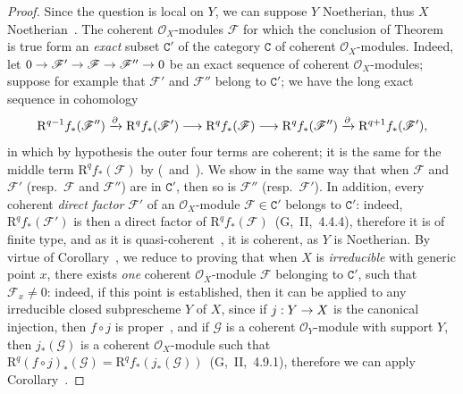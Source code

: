 \documentclass[oneside]{amsart}
\theoremstyle{ega-env-style}
\theoremstyle{ega-thm-env-style}
\theoremstyle{ega-defn-env-style}
\def\mathcal{\mathscr}
\def\sh{\mathcal}                   %
\def\cat{\mathtt}                   %
\def\RR{\mathrm{R}}                 %
\def\C{\cat{C}}                     %
\renewcommand{\to}{\mathchoice{\longrightarrow}{\rightarrow}{\rightarrow}{\rightarrow}}
\newcommand{\oldpage}[2][]{{\marginnote{\normalfont{\textbf{#1}~|~#2}}}\ignorespaces}
\begin{document}
\begin{proof}
Since the question is local on $Y$, we can suppose $Y$ Noetherian, thus $X$ Noetherian~.
The coherent $\sh{O}_X$-modules $\sh{F}$ for which the conclusion of Theorem~ is true form an \emph{exact} subset $\C'$ of the category $\C$ of coherent $\sh{O}_X$-modules.
\oldpage[III]{117}
Indeed, let $0\to\sh{F}'\to\sh{F}\to\sh{F}''\to 0$ be an exact sequence of coherent $\sh{O}_X$-modules; suppose for example that $\sh{F}'$ and $\sh{F}''$ belong to $\C'$; we have the long exact sequence in cohomology
\[
  \RR^{q-1}f_*(\sh{F}'')\xrightarrow{\partial}\RR^q f_*(\sh{F}')\to\RR^q f_*(\sh{F})\to\RR^q f_*(\sh{F}'')\xrightarrow{\partial}\RR^{q+1}f_*(\sh{F}'),
\]
in which by hypothesis the outer four terms are coherent; it is the same for the middle term $\RR^q f_*(\sh{F})$ by (~and~).
We show in the same way that when $\sh{F}$ and $\sh{F}'$ (resp.~$\sh{F}$ and $\sh{F}''$) are in $\C'$, then so is $\sh{F}''$ (resp.~$\sh{F}'$).
In addition, every coherent \emph{direct factor} $\sh{F}'$ of an $\sh{O}_X$-module $\sh{F}\in\C'$ belongs to $\C'$: indeed, $\RR^q f_*(\sh{F}')$ is then a direct factor of $\RR^q f_*(\sh{F})$~(G,~II,~4.4.4), therefore it is of finite type, and as it is quasi-coherent~, it is coherent, as $Y$ is Noetherian.
By virtue of Corollary~, we reduce to proving that when $X$ is \emph{irreducible} with generic point $x$, there exists \emph{one} coherent $\sh{O}_X$-module $\sh{F}$ belonging to $\C'$, such that $\sh{F}_x\neq 0$: indeed, if this point is established, then it can be applied to any irreducible closed subprescheme $Y$ of $X$, since if $j:Y\to X$ is the canonical injection, then $f\circ j$ is proper~, and if $\sh{G}$ is a coherent $\sh{O}_Y$-module with support $Y$, then $j_*(\sh{G})$ is a coherent $\sh{O}_X$-module such that $\RR^q(f\circ j)_*(\sh{G})=\RR^q f_*(j_*(\sh{G}))$~(G,~II,~4.9.1), therefore we can apply Corollary~.


\end{proof}
\end{document}
